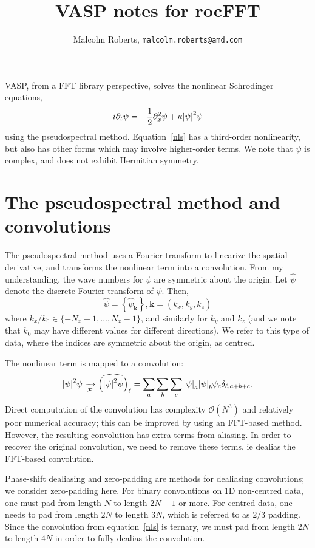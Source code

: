 \documentclass[12pt]{article}
\title{VASP notes for rocFFT}
\author{Malcolm Roberts, \texttt{malcolm.roberts@amd.com}}
\renewcommand{\(}{\left(}
\renewcommand{\)}{\right)}
\begin{document}
\maketitle

VASP, from a FFT library perspective, solves the nonlinear
Schrodinger equations,
\begin{dmath}
  \label{nls}
  i\partial_t\psi = -\frac{1}{2} \partial_x^2 \psi + \kappa \abs{\psi}^2\psi
\end{dmath}
using the pseudospectral method.  Equation~\eqref{nls} has a
third-order nonlinearity, but also has other forms which may involve
higher-order terms.  We note that $\psi$ is complex, and does not
exhibit Hermitian symmetry.

\section{The pseudospectral method and convolutions}

The pseudospectral method uses a Fourier transform to linearize the
spatial derivative, and transforms the nonlinear term into a
convolution.  From my understanding, the wave numbers for $\psi$ are
symmetric about the origin.  Let $\hat\psi$ denote the discrete
Fourier transform of $\psi$.  Then,
\begin{equation}
  \hat\psi = \left\{\hat\psi_{\mathbf{k}} \right\},
  \mathbf{k} = \(k_x, k_y, k_z\)
\end{equation}
where $k_x/k_0 \in \{-N_x +1, \dots, N_x -1\}$, and similarly for
$k_y$ and $k_z$ (and we note that $k_0$ may have different values for
different directions).  We refer to this type of data, where the
indices are symmetric about the origin, as centred.

The nonlinear term is mapped to a convolution:
\begin{equation}
  \abs{\psi}^2\psi
  \xrightarrow[\mathcal{F}]{}
  \widehat{\(\abs{\psi}^2\psi\)}_\ell
  =
  \sum_{a}\sum_{b}\sum_{c} \abs{\psi}_a \abs{\psi}_b \psi_c \delta_{\ell, a+b+c}.
\end{equation}
Direct computation of the convolution has complexity
$\mathcal{O}(N^3)$ and relatively poor numerical accuracy; this can be
improved by using an FFT-based method.  However, the resulting
convolution has extra terms from aliasing.  In order to recover the
original convolution, we need to remove these terms, ie dealias the
FFT-based convolution.

Phase-shift dealiasing and zero-padding are methods for dealiasing
convolutions; we consider zero-padding here. For binary convolutions
on 1D non-centred data, one must pad from length $N$ to length $2N-1$
or more.  For centred data, one needs to pad from length $2N$ to
length $3N$, which is referred to as $2/3$ padding.  Since the
convolution from equation~\eqref{nls} is ternary, we must pad from
length $2N$ to length $4N$ in order to fully dealias the convolution.
\end{document}
